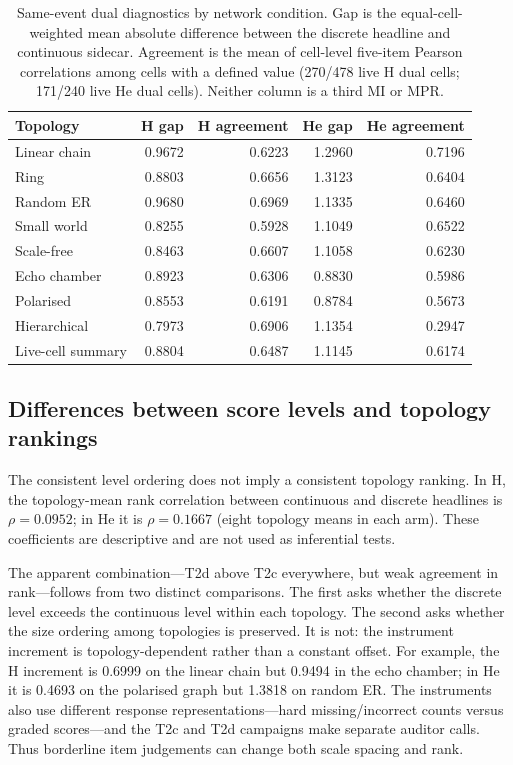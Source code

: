 \begin{table}[t]
\centering
\caption{Same-event dual diagnostics by network condition. Gap is the
equal-cell-weighted mean absolute difference between the discrete headline and
continuous sidecar. Agreement is the mean of cell-level five-item Pearson
correlations among cells with a defined value (270/478 live H dual cells;
171/240 live He dual cells). Neither column is a third MI or MPR.}
\label{tab:mpr-diagnostics}
\small
\begin{tabular}{lrrrr}
\toprule
Topology & H gap & H agreement & He gap & He agreement \\
\midrule
Linear chain & 0.9672 & 0.6223 & 1.2960 & 0.7196 \\
Ring         & 0.8803 & 0.6656 & 1.3123 & 0.6404 \\
Random ER    & 0.9680 & 0.6969 & 1.1335 & 0.6460 \\
Small world  & 0.8255 & 0.5928 & 1.1049 & 0.6522 \\
Scale-free   & 0.8463 & 0.6607 & 1.1058 & 0.6230 \\
Echo chamber & 0.8923 & 0.6306 & 0.8830 & 0.5986 \\
Polarised    & 0.8553 & 0.6191 & 0.8784 & 0.5673 \\
Hierarchical & 0.7973 & 0.6906 & 1.1354 & 0.2947 \\
\midrule
Live-cell summary & 0.8804 & 0.6487 & 1.1145 & 0.6174 \\
\bottomrule
\end{tabular}
\end{table}

\subsection{Differences between score levels and topology rankings}
\label{subsec:mpr-ranks}

The consistent level ordering does not imply a consistent topology ranking.
In H, the topology-mean rank correlation between continuous and discrete
headlines is $\rho=0.0952$; in He it is $\rho=0.1667$ (eight topology means
in each arm).  These coefficients are descriptive and are not used as
inferential tests.

The apparent combination---T2d above T2c everywhere, but weak agreement in
rank---follows from two distinct comparisons.  The first asks whether the
discrete level exceeds the continuous level within each topology.  The
second asks whether the size ordering among topologies is preserved.  It is
not: the instrument increment is topology-dependent rather than a constant
offset.  For example, the H increment is 0.6999 on the linear chain but
0.9494 in the echo chamber; in He it is 0.4693 on the polarised graph but
1.3818 on random ER.  The instruments also use different response
representations---hard missing/incorrect counts versus graded scores---and
the T2c and T2d campaigns make separate auditor calls.  Thus borderline
item judgements can change both scale spacing and rank.

